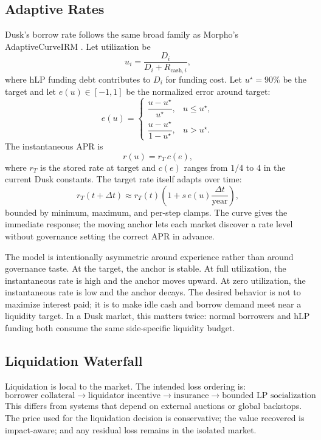 \documentclass[11pt]{article}
\newcommand{\cash}{\mathrm{cash}}
\begin{document}
\subsection{Adaptive Rates}

Dusk's borrow rate follows the same broad family as Morpho's AdaptiveCurveIRM \cite{morpho-irm,morpho-irm-github}. Let utilization be
\begin{equation}
u_i=\frac{D_i}{D_i+R_{\cash,i}},
\end{equation}
where hLP funding debt contributes to $D_i$ for funding cost. Let $u^\star=90\%$ be the target and let $e(u)\in[-1,1]$ be the normalized error around target:
\begin{equation}
e(u)=
\begin{cases}
\dfrac{u-u^\star}{u^\star}, & u\le u^\star,\\[0.7em]
\dfrac{u-u^\star}{1-u^\star}, & u>u^\star.
\end{cases}
\end{equation}
The instantaneous APR is
\begin{equation}
r(u)=r_T\,c(e),
\end{equation}
where $r_T$ is the stored rate at target and $c(e)$ ranges from $1/4$ to $4$ in the current Dusk constants. The target rate itself adapts over time:
\begin{equation}
r_T(t+\Delta t)\approx r_T(t)\left(1+s\,e(u)\frac{\Delta t}{\mathrm{year}}\right),
\end{equation}
bounded by minimum, maximum, and per-step clamps. The curve gives the immediate response; the moving anchor lets each market discover a rate level without governance setting the correct APR in advance.

The model is intentionally asymmetric around experience rather than around governance taste. At the target, the anchor is stable. At full utilization, the instantaneous rate is high and the anchor moves upward. At zero utilization, the instantaneous rate is low and the anchor decays. The desired behavior is not to maximize interest paid; it is to make idle cash and borrow demand meet near a liquidity target. In a Dusk market, this matters twice: normal borrowers and hLP funding both consume the same side-specific liquidity budget.

\subsection{Liquidation Waterfall}

Liquidation is local to the market. The intended loss ordering is:
\[
\boxed{
\text{borrower collateral}
\rightarrow
\text{liquidator incentive}
\rightarrow
\text{insurance}
\rightarrow
\text{bounded LP socialization}
}
\]
This differs from systems that depend on external auctions or global backstops. The price used for the liquidation decision is conservative; the value recovered is impact-aware; and any residual loss remains in the isolated market.
\end{document}
